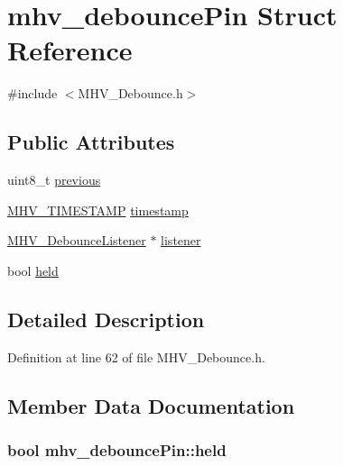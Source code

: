 \hypertarget{structmhv__debounce_pin}{
\section{mhv\-\_\-debounce\-Pin \-Struct \-Reference}
\label{structmhv__debounce_pin}
}


{\ttfamily \#include $<$\-M\-H\-V\-\_\-\-Debounce.\-h$>$}

\subsection*{\-Public \-Attributes}
\begin{DoxyCompactItemize}
\item 
uint8\-\_\-t \hyperlink{structmhv__debounce_pin_ac811cadb60a02f9b98876e62bb8df8fc}{previous}
\item 
\hyperlink{_m_h_v___r_t_c_8h_a1e30d3a92b1b868286bd0d619245d8a6}{\-M\-H\-V\-\_\-\-T\-I\-M\-E\-S\-T\-A\-M\-P} \hyperlink{structmhv__debounce_pin_a0d8a978d0e2cb1677e30b174986583f2}{timestamp}
\item 
\hyperlink{class_m_h_v___debounce_listener}{\-M\-H\-V\-\_\-\-Debounce\-Listener} $\ast$ \hyperlink{structmhv__debounce_pin_aa7c133ca2e2edc8c1df591ef842432b9}{listener}
\item 
bool \hyperlink{structmhv__debounce_pin_a27f3b74fb30ca3bb8aa684d06ae58d16}{held}
\end{DoxyCompactItemize}


\subsection{\-Detailed \-Description}


\-Definition at line 62 of file \-M\-H\-V\-\_\-\-Debounce.\-h.



\subsection{\-Member \-Data \-Documentation}
\hypertarget{structmhv__debounce_pin_a27f3b74fb30ca3bb8aa684d06ae58d16}{
\subsubsection[{held}]{\setlength{\rightskip}{0pt plus 5cm}bool {\bf mhv\-\_\-debounce\-Pin\-::held}}}
\label{structmhv__debounce_pin_a27f3b74fb30ca3bb8aa684d06ae58d16}


